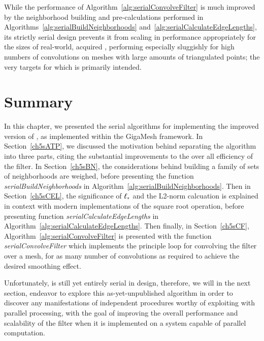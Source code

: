 %
%

While the performance of Algorithm~\ref{alg:serialConvolveFilter} is much improved by the neighborhood building and pre-calculations performed in Algorithms~\ref{alg:serialBuildNeighborhoods} and~\ref{alg:serialCalculateEdgeLengths}, its strictly serial design prevents it from scaling in performance appropriately for the sizes of real-world, acquired \tdd{}, performing especially sluggishly for high numbers of convolutions on meshes with large amounts of triangulated points; the very targets for which  is primarily intended.

%
%
%
%
\section{Summary}
\label{ch5sDN}
In this chapter, we presented the serial algorithms for implementing the improved version of , as implemented within the GigaMesh framework. In Section~\ref{ch5sATP}, we discussed the motivation behind separating the algorithm into three parts, citing the substantial improvements to the over all efficiency of the filter. In Section~\ref{ch5sBN}, the considerations behind building a family of sets of neighborhoods are weighed, before presenting the function \textit{serialBuildNeighborhoods} in Algorithm~\ref{alg:serialBuildNeighborhoods}. Then in Section~\ref{ch5sCEL}, the significance of $\ell_\ast$ and the L2-norm calcuation is explained in context with modern implementations of the square root operation, before presenting function \textit{serialCalculateEdgeLengths} in Algorithm~\ref{alg:serialCalculateEdgeLengths}.   Then finally, in Section~\ref{ch5sCF}, Algorithm~\ref{alg:serialConvolveFilter} is presented with the function \textit{serialConvolveFilter} which implements the principle loop for convolving the filter over a mesh, for as many number of convolutions as required to achieve the desired smoothing effect.

Unfortunately,  is still yet entirely serial in design, therefore, we will in the next section, endeavor to explore this as-yet-unpublished algorithm in order to discover any manifestations of independent procedures worthy of exploiting with parallel processing, with the goal of improving the overall performance and scalability of the filter when it is implemented on a system capable of parallel computation.

